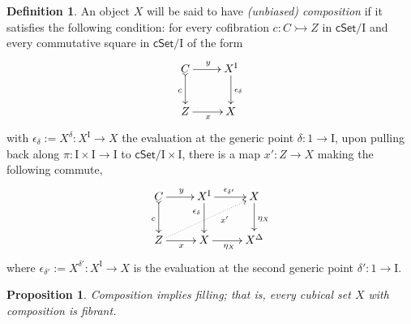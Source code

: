 \documentclass[12pt]{article}
\newcommand{\cSet}{\ensuremath{\mathsf{cSet}}}
\newcommand{\mono}{\ensuremath{\rightarrowtail}}
\newcommand{\ra}{\ensuremath{\rightarrow}}
\newcommand{\I}{\ensuremath{\mathrm{I}}}
\newtheorem{proposition}[theorem]{Proposition}
\theoremstyle{remark}
\theoremstyle{definition}
\newtheorem{definition}[theorem]{Definition}
\begin{document}
\begin{definition}\label{def:unbiasedcomposition}
An object $X$ will be said to have \emph{(unbiased) composition} if it satisfies the following condition: for every cofibration $c : C \mono Z$ in $\cSet/\I$ and every commutative square in $\cSet/\I$ of the form
\begin{equation*}\label{diagram:compdef1}
\xymatrix{
C \ar@{>->}[d]_{c} \ar[r]^y  & X^\I \ar[d]^{\epsilon_\delta} \\
Z \ar[r]_x & X
}
\end{equation*}
with $\epsilon_\delta := X^\delta : X^\I \ra X$ the evaluation at the generic point $\delta : 1 \ra \I$, upon pulling back along $\pi : \I\times\I \ra \I$ to $\cSet/\I\times\I$, there is a map $x' : Z \ra X$ making the following commute, 
\begin{equation}\label{diagram:compdef2}
\xymatrix{
C \ar@{>->}[d]_{c} \ar[r]^y  & X^\I \ar[d]_>>>>>>>{\epsilon_\delta} \ar[r]^{\epsilon_{\delta'}} &  X \ar[d]^{\eta_X}\\
Z  \ar@{..>}[rru]_>>>>>>>>>{x'} \ar[r]_x & X \ar[r]_{\eta_X} & X^\Delta 
}
\end{equation}
where $\epsilon_{\delta'} := X^{\delta'} : X^\I \ra X$ is the evaluation at the second generic point $\delta' : 1 \ra \I$.

\end{definition}

\begin{proposition}\label{prop:comptofillobj}
Composition implies filling; that is, every cubical set $X$ with composition is fibrant.
\end{proposition}
\end{document}
